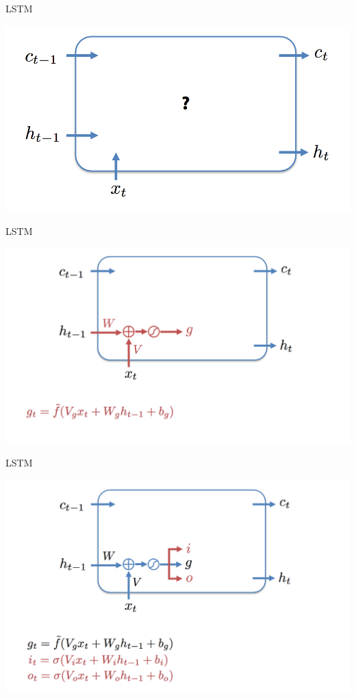 \documentclass[notes,12pt, aspectratio=169]{beamer}
\begin{document}
\begin{frame}{LSTM}
\begin{center}
	\includegraphics[width=.8\linewidth]{lstm1.png}
\end{center}
\end{frame}


\begin{frame}{LSTM}
\begin{center}
	\includegraphics[width=.8\linewidth]{lstm2.png}
\end{center}
\end{frame}


\begin{frame}{LSTM}
\begin{center}
	\includegraphics[width=.8\linewidth]{lstm3.png}
\end{center}
\end{frame}
\end{document}

